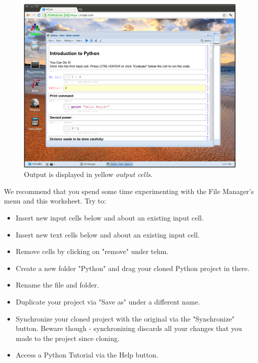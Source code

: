 \documentclass{article}
\begin{document}
\begin{figure}[!ht]
\begin{center}
\includegraphics[width=\textwidth]{img/fileman5.png}
\end{center}
\caption{Output is displayed in yellow {\em output cells}.}
\label{fig:fileman5}
\end{figure}
\noindent
We recommend that you spend some time experimenting with the 
File Manager's menu and this worksheet. Try to:
\begin{itemize}
\item Insert new input cells below and about an existing input cell.
\item Insert new text cells below and about an existing input cell.
\item Remove cells by clicking on "remove" under tehm.
\item Create a new folder "Python" and drag your cloned Python 
      project in there. 
\item Rename the file and folder.
\item Duplicate your project via "Save as" under a different name.
\item Synchronize your cloned project with the original via the 
      "Synchronize" button. Beware though - synchronizing discards 
      all your changes that you made to the project since cloning. 
\item Access a Python Tutorial via the Help button.
\end{itemize}
\end{document}
